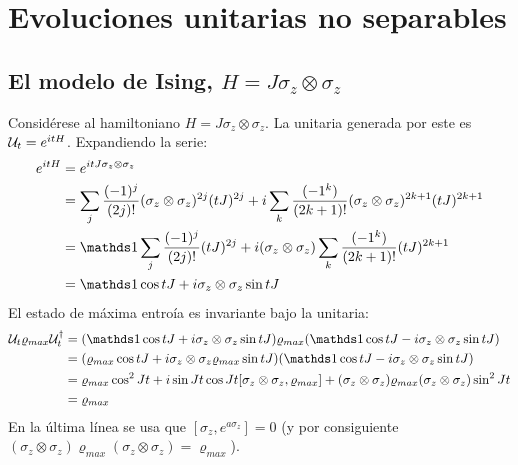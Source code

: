 \section{Evoluciones unitarias no separables}
\subsection{El modelo de Ising, $H=J\sigma_{z}\otimes\sigma_{z}$}
Considérese al hamiltoniano $H=J\sigma_{z}\otimes\sigma_{z}$. La unitaria generada por este es $\mathcal{U}_{t}=e^{itH}$. Expandiendo la serie:
\begin{align*}
    e^{itH}&=e^{itJ\sigma_{z}\otimes\sigma_{z}}\\
    &=\sum_{j}\frac{(-1)^{j}}{(2j)!}(\sigma_{z}\otimes\sigma_{z})^{2j}(tJ)^{2j}+i\sum_{k}\frac{(-1^{k})}{(2k+1)!}(\sigma_{z}\otimes\sigma_{z})^{2k+1}(tJ)^{2k+1}\\
    &=\Id\sum_{j}\frac{(-1)^{j}}{(2j)!}(tJ)^{2j}+i(\sigma_{z}\otimes\sigma_{z})\sum_{k}\frac{(-1^{k})}{(2k+1)!}(tJ)^{2k+1}\\
    &=\Id \cos{tJ} + i\sigma_{z}\otimes\sigma_{z}\sin{tJ}
\end{align*}
El estado de máxima entroía es invariante bajo la unitaria:
\begin{align*}
    \mcU_{t}\varrho_{max}\mcU_{t}^{\dag}&=(\Id \cos{tJ} + i\sigma_{z}\otimes\sigma_{z}\sin{tJ})\varrho_{max}(\Id \cos{tJ} - i\sigma_{z}\otimes\sigma_{z}\sin{tJ})\\
    &=(\varrho_{max} \cos{tJ} + i\sigma_{z}\otimes\sigma_{z}\varrho_{max}\sin{tJ})(\Id \cos{tJ} - i\sigma_{z}\otimes\sigma_{z}\sin{tJ})\\
    &=\varrho_{max} \cos^{2}{Jt}+i\sin{Jt}\cos{Jt}[\sigma_{z}\otimes\sigma_{z},\varrho_{max}]+(\sigma_{z}\otimes\sigma_{z}) \varrho_{max} (\sigma_{z}\otimes\sigma_{z}) \sin^{2}{Jt}\\
    &=\varrho_{max}
\end{align*}
En la última línea se usa que $[\sigma_{z},e^{a\sigma_{z}}]=0$ (y por consiguiente $(\sigma_{z}\otimes\sigma_{z}) \varrho_{max} (\sigma_{z}\otimes\sigma_{z})=\varrho_{max}$). 